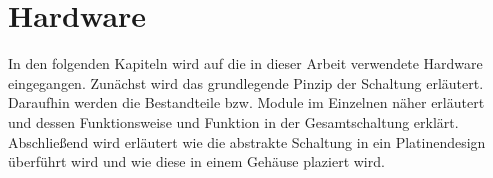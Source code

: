 
\newpage
\section{Hardware}
In den folgenden Kapiteln wird auf die in dieser Arbeit verwendete Hardware eingegangen. Zunächst wird das grundlegende Pinzip der Schaltung erläutert. Daraufhin werden die Bestandteile bzw. Module im Einzelnen näher erläutert und dessen Funktionsweise und Funktion in der Gesamtschaltung erklärt. Abschließend wird erläutert wie die abstrakte Schaltung in ein Platinendesign überführt wird und wie diese in einem Gehäuse plaziert wird. 










